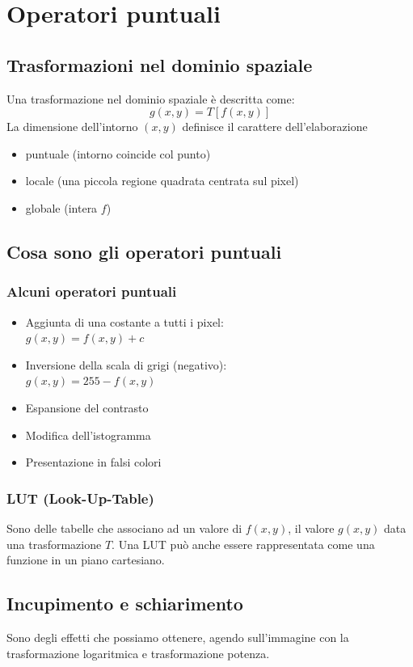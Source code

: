 \documentclass{report}
\begin{document}
	\chapter{Operatori puntuali}
	\section{Trasformazioni nel dominio spaziale}
	Una trasformazione nel dominio spaziale è descritta come:
	$$
	g(x,y) = T[f(x,y)]
	$$
	La dimensione dell'intorno $(x,y)$ definisce il carattere dell'elaborazione
	\begin{itemize}
		\item puntuale (intorno coincide col punto)
		\item locale (una piccola regione quadrata centrata sul pixel)
		\item globale (intera $f$)
	\end{itemize}
	\section{Cosa sono gli operatori puntuali}
	\subsection{Alcuni operatori puntuali}
	\begin{itemize}
		\item Aggiunta di una costante a tutti i pixel:\\
		      $g(x,y) = f(x,y) + c$
		\item Inversione della scala di grigi (negativo):\\
		      $g(x,y) = 255 - f(x,y)$
		\item Espansione del contrasto
		\item Modifica dell'istogramma
		\item Presentazione in falsi colori
		      \newpage
	\end{itemize}
	\subsection{LUT (Look-Up-Table)}
	Sono delle tabelle che associano ad un valore di $f(x,y)$, il valore $g(x,y)$ data una trasformazione $T$. Una LUT può anche essere rappresentata come una funzione in un piano cartesiano.
	
	\section{Incupimento e schiarimento}
	Sono degli effetti che possiamo ottenere, agendo sull'immagine con la trasformazione logaritmica e trasformazione potenza.
\end{document}
